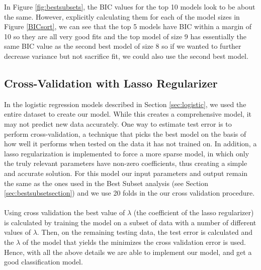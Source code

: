 \documentclass{article}
\begin{document}
In Figure \ref{fig:bestsubsets}, the BIC values for the top 10 models look to be about the same.  However, explicitly calculating them for each of the model sizes in Figure \ref{BICsort}, we can see that the top 5 models have BIC within a margin of 10 so they are all very good fits and the top model of size 9 has essentially the same BIC value as the second best model of size 8 so if we wanted to further decrease variance but not sacrifice fit, we could also use the second best model.
%
\subsection{Cross-Validation with Lasso Regularizer}
In the logistic regression models described in Section \ref{sec:logistic}, we used the entire dataset to create our model.  While this creates a comprehensive model, it may not predict new data accurately.  One way to estimate test error is to perform cross-validation, a technique that picks the best model on the basis of how well it performs when tested on the data it has not trained on. In addition, a lasso regularization is implemented to force a more sparse model, in which only the truly relevant parameters have non-zero coefficients, thus creating a simple and accurate solution.  For this model our input parameters and output remain the same as the ones used in the Best Subset analysis (see Section \ref{sec:bestsubsetsection}) and we use 20 folds in the our cross validation procedure.\\
\null\\
Using cross validation the best value of $\lambda$ (the coefficient of the lasso regularizer) is calculated by training the model on a subset of data with a number of different values of $\lambda$.  Then, on the remaining testing data, the test error is calculated and the $\lambda$ of the model that yields the minimizes the cross validation error is used. Hence, with all the above details we are able to implement our model, and get a good classification model.
%
\end{document}
